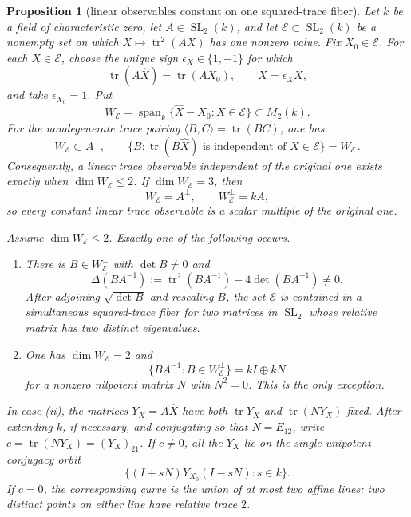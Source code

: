 \documentclass[11pt,reqno]{amsart}
\newtheorem{proposition}[theorem]{Proposition}
\theoremstyle{definition}
\theoremstyle{remark}
\newcommand{\Tr}{\operatorname{tr}}
\newcommand{\Span}{\operatorname{span}}
\newcommand{\SL}{\operatorname{SL}}
\begin{document}
\begin{proposition}[linear observables constant on one squared-trace fiber]
\label{prop:signed-collision-span}
Let \(k\) be a field of characteristic zero, let \(A\in\SL_2(k)\), and
let \(\mathcal E\subset\SL_2(k)\) be a nonempty set on which
\(X\mapsto\Tr^2(AX)\) has one nonzero value.  Fix
\(X_0\in\mathcal E\).  For each \(X\in\mathcal E\), choose the unique
sign \(\epsilon_X\in\{1,-1\}\) for which
\[
 \Tr(A\widehat X)=\Tr(AX_0),
 \qquad \widehat X=\epsilon_XX,
\]
and take \(\epsilon_{X_0}=1\).  Put
\[
 W_{\mathcal E}=
 \Span_k\{\widehat X-X_0:X\in\mathcal E\}\subset M_2(k).
\]
For the nondegenerate trace pairing
\(\langle B,C\rangle=\Tr(BC)\), one has
\[
 W_{\mathcal E}\subset A^\perp,
 \qquad
 \{B:\Tr(B\widehat X)\text{ is independent of }X\in\mathcal E\}
 =W_{\mathcal E}^\perp.
\tag{13.10s}
\]
Consequently, a linear trace observable independent of the original one
exists exactly when \(\dim W_{\mathcal E}\le2\).  If
\(\dim W_{\mathcal E}=3\), then
\[
 W_{\mathcal E}=A^\perp,
 \qquad W_{\mathcal E}^\perp=kA,
\]
so every constant linear trace observable is a scalar multiple of the
original one.

Assume \(\dim W_{\mathcal E}\le2\).  Exactly one of the following occurs.
\begin{enumerate}[label=\textup{(\roman*)}]
\item There is \(B\in W_{\mathcal E}^\perp\) with \(\det B\ne0\) and
\[
 \Delta(BA^{-1})
 :=\Tr^2(BA^{-1})-4\det(BA^{-1})\ne0.
\tag{13.10t}
\]
After adjoining \(\sqrt{\det B}\) and rescaling \(B\), the set
\(\mathcal E\) is contained in a simultaneous squared-trace fiber for
two matrices in \(\SL_2\) whose relative matrix has two distinct
eigenvalues.
\item One has \(\dim W_{\mathcal E}=2\) and
\[
 \{BA^{-1}:B\in W_{\mathcal E}^\perp\}
   =kI\oplus kN
\tag{13.10u}
\]
for a nonzero nilpotent matrix \(N\) with \(N^2=0\).  This is the only
exception.
\end{enumerate}
In case \textup{(ii)}, the matrices \(Y_X=A\widehat X\) have both
\(\Tr Y_X\) and \(\Tr(NY_X)\) fixed.  After extending \(k\), if
necessary, and conjugating so that \(N=E_{12}\), write
\(c=\Tr(NY_X)=(Y_X)_{21}\).  If \(c\ne0\), all the \(Y_X\) lie on the
single unipotent conjugacy orbit
\[
 \{(I+sN)Y_{X_0}(I-sN):s\in k\}.
\tag{13.10v}
\]
If \(c=0\), the corresponding curve is the union of at most two affine
lines; two distinct points on either line have relative trace \(2\).
\end{proposition}
\end{document}
